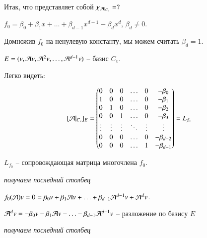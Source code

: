 \documentclass[main]{subfiles}
\begin{document}
Итак, что представляет собой $\chi_{\mathcal{A} |_{C_v}} = ?$

$f_0 = \beta_0 + \beta_1 x + \ldots + \beta_{d-1} x^{d-1} + \beta_{d} x^{d}$, $\beta_d \neq 0$.

Домножив $f_0$ на ненулевую константу, мы можем считать $\beta_d = 1$.

$E = (v, \mathcal{A} v, {\mathcal{A}}^2 v, \ldots, {\mathcal{A}}^{d-1} v)$ -- базис $C_v$.

Легко видеть:

\[[\mathcal{A} |_{C_v}]_E = \begin{pmatrix}
        0      & 0      & 0      & \ldots & 0      & -\beta_0     \\
        1      & 0      & 0      & \ldots & 0      & -\beta_1     \\
        0      & 1      & 0      & \ldots & 0      & -\beta_2     \\
        0      & 0      & 1      & \ldots & 0      & -\beta_3     \\
        \vdots & \vdots & \vdots & \ddots & \vdots & \vdots       \\
        0      & 0      & 0      & \ldots & 0      & -\beta_{d-2} \\
        0      & 0      & 0      & \ldots & 1      & -\beta_{d-1} \\
    \end{pmatrix} = L_{f_0}\]

\begin{center}
    $L_{f_0}$ -- сопровождающая матрица многочлена $f_0$.
\end{center}

\begin{center}
    \textsl{получаем последний столбец}

    $f_0(\mathcal{A}) v = 0 = \beta_0 v + \beta_1 \mathcal{A} v + \ldots + \beta_{d-1} \mathcal{A}^{d-1} v + \mathcal{A}^d v$.

    ${\mathcal{A}}^d v = -\beta_0 v - \beta_1 \mathcal{A} v - \ldots - \beta_{d-1} {\mathcal{A}}^{d-1} v$ -- разложение по базису $E$

    \textsl{получаем последний столбец}
\end{center}
\end{document}
